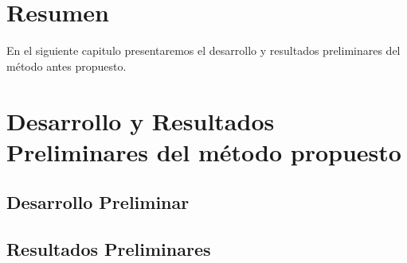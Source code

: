\chapter*{Resumen}
En el siguiente capitulo presentaremos el desarrollo y resultados preliminares del método antes propuesto.

\chapter{Desarrollo y Resultados Preliminares del método propuesto}


\section{Desarrollo Preliminar}

\section{Resultados Preliminares}
